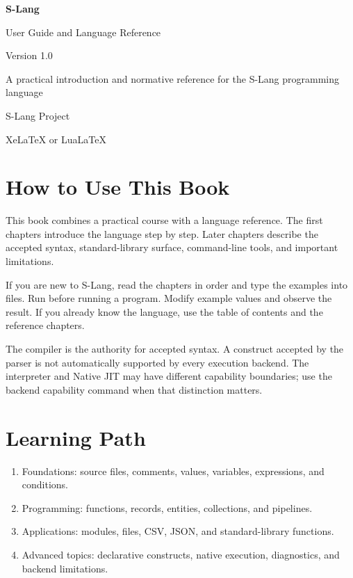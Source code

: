\documentclass[11pt,a4paper,oneside]{book}
\newcommand{\code}[1]{\texttt{\detokenize{#1}}}
\newcommand{\version}{1.0}
\begin{document}
\frontmatter
\begin{titlepage}\centering\vspace*{32mm}
{\Huge\bfseries S-Lang\par}\vspace{5mm}
{\LARGE User Guide and Language Reference\par}\vspace{14mm}
{\Large Version \version\par}\vspace{8mm}
{\large A practical introduction and normative reference for the S-Lang programming language\par}
\vfill
{\large S-Lang Project\par}
{\large XeLaTeX or LuaLaTeX\par}\vspace{12mm}
\end{titlepage}
\chapter*{How to Use This Book}
This book combines a practical course with a language reference. The first chapters introduce the language step by step. Later chapters describe the accepted syntax, standard-library surface, command-line tools, and important limitations.

If you are new to S-Lang, read the chapters in order and type the examples into \code{.sl} files. Run \code{slang check} before running a program. Modify example values and observe the result. If you already know the language, use the table of contents and the reference chapters.

The compiler is the authority for accepted syntax. A construct accepted by the parser is not automatically supported by every execution backend. The interpreter and Native JIT may have different capability boundaries; use the backend capability command when that distinction matters.

\chapter*{Learning Path}
\begin{enumerate}
\item Foundations: source files, comments, values, variables, expressions, and conditions.
\item Programming: functions, records, entities, collections, and pipelines.
\item Applications: modules, files, CSV, JSON, and standard-library functions.
\item Advanced topics: declarative constructs, native execution, diagnostics, and backend limitations.
\end{enumerate}
\tableofcontents
\mainmatter
\end{document}
